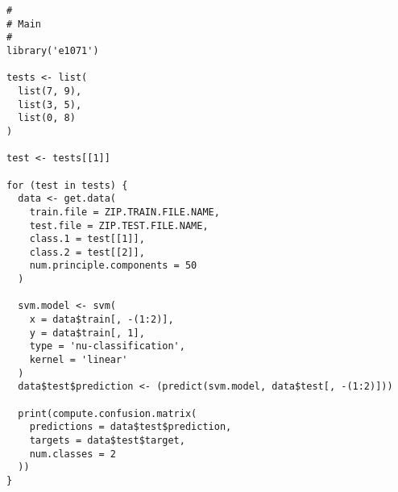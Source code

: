 \documentclass{article}
\begin{document}
\begin{verbatim}
#
# Main
#
library('e1071')

tests <- list(
  list(7, 9),
  list(3, 5),
  list(0, 8)
)

test <- tests[[1]]

for (test in tests) {
  data <- get.data(
    train.file = ZIP.TRAIN.FILE.NAME,
    test.file = ZIP.TEST.FILE.NAME,
    class.1 = test[[1]],
    class.2 = test[[2]],
    num.principle.components = 50
  )

  svm.model <- svm(
    x = data$train[, -(1:2)],
    y = data$train[, 1],
    type = 'nu-classification',
    kernel = 'linear'
  )
  data$test$prediction <- (predict(svm.model, data$test[, -(1:2)]))

  print(compute.confusion.matrix(
    predictions = data$test$prediction,
    targets = data$test$target,
    num.classes = 2
  ))
}
\end{verbatim}
%
\end{document}
